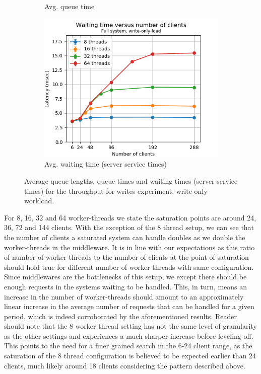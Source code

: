 \documentclass[11pt,a4paper]{article}
\begin{document}
\begin{figure}[h]
\begin{subfigure}{.33\textwidth}
  \caption{Avg. queue time}
  \label{fig:tpfw-qtime_mw}
\end{subfigure}%
\begin{subfigure}{.33\textwidth}
  \centering
  \includegraphics[width=1.0\linewidth,trim={0px 0px 0px 0px},clip]{img/plot/tpfw-wtime_mw.png}
  \caption{Avg. waiting time (server service times)}
  \label{fig:tpfw-wtime_mw}
\end{subfigure}
\caption{Average queue lengths, queue times and waiting times (server service times) for the throughput for writes experiment, write-only workload.}
\label{fig:tpfw_stats_mw}
\end{figure}
\par For 8, 16, 32 and 64 worker-threads we state the saturation points are around 24, 36, 72 and 144 clients. With the exception of the 8 thread setup, we can see that the number of clients a saturated system can handle doubles as we double the worker-threads in the middleware. It is in line with our expectations as this ratio of number of worker-threads to the number of clients at the point of saturation should hold true for different number of worker threads with same configuration. Since middlewares are the bottlenecks of this setup, we except there should be enough requests in the systems waiting to be handled. This, in turn, means an increase in the number of worker-threads should amount to an approximately linear increase in the average number of requests that can be handled for a given period, which is indeed corroborated by the aforementioned results. Reader should note that the 8 worker thread setting has not the same level of granularity as the other settings and experiences a much sharper increase before leveling off. This points to the need for a finer grained search in the 6-24 client range, as the saturation of the 8 thread configuration is believed to be expected earlier than 24 clients, much likely around 18 clients considering the pattern described above.
\end{document}
